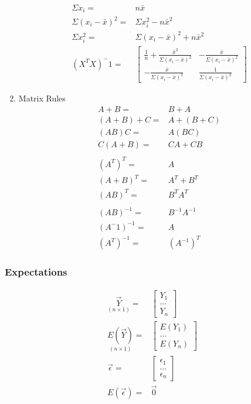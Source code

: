 \documentclass[11pt]{article}
\begin{document}
\begin{enumerate}
\begin{equation}
\begin{split}
\Sigma x_i = & n \bar{x}\\
\Sigma (x_i - \bar{x})^2 = & \Sigma x_i^2 - n \bar{x}^2\\
\Sigma x_i^2 = & \Sigma (x_i - \bar{x})^2 + n \bar{x}^2\\
(X^T X)^-1 = & \begin{bmatrix}
\frac{1}{n} + \frac{\bar{x}^2}{\Sigma (x_i - \bar{x})^2} & - \frac{\bar{x}}{\Sigma (x_i - \bar{x})^2}\\
- \frac{\bar{x}}{\Sigma (x_i - \bar{x})^2} & \frac{1}{\Sigma (x_i - \bar{x})^2}
\end{bmatrix}
\end{split}
\end{equation}
\item Matrix Rules
\label{sec:org974683b}
\begin{equation}
\begin{split}
A + B = & B + A\\
(A + B) + C = & A + (B + C)\\
(AB)C = & A(BC)\\
C(A + B) = & CA + CB\\
\\
(A^T)^T = & A\\
(A + B)^T = & A^T + B^T\\
(AB)^T = & B^T A^T\\
\\
(AB)^{-1} = & B^{-1} A^{-1}\\
(A^-1)^{-1} = & A\\
(A^T)^{-1} = & (A^{-1})^T
\end{split}
\end{equation}
\end{enumerate}

\subsubsection{Expectations}
\label{sec:org7dff791}
\begin{equation}
\begin{split}
\underset{(n \times 1)}{\vec{Y}} = & \begin{bmatrix}
Y_1\\
...\\
Y_n
\end{bmatrix}\\
\underset{(n \times 1)}{E(\vec{Y})} = & \begin{bmatrix}
E(Y_1)\\
...\\
E(Y_n)
\end{bmatrix}\\
\vec{\epsilon} = & \begin{bmatrix}
\epsilon_1\\
...\\
\epsilon_n
\end{bmatrix}\\
E(\vec{\epsilon}) = & \vec{0}
\end{split}
\end{equation}
\end{document}
